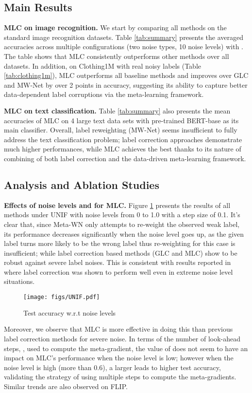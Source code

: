 \subsection{Main Results}


\textbf{MLC on image recognition.} We start by comparing all methods
on the standard image recognition datasets. Table \ref{tab:summary}
presents the averaged accuracies across multiple configurations (two
noise types, 10 noise levels) with . The table shows that MLC
consistently outperforms other methods over all datasets.  In
addition, on Clothing1M with real noisy labels (Table
\ref{tab:clothing1m}), MLC outperforms all baseline methods and
improves over GLC and MW-Net by over 2 points in accuracy, suggesting
its ability to capture better data-dependent label corruptions via the
meta-learning framework.

\textbf{MLC on text classification.} Table \ref{tab:summary} also
presents the mean accuracies of MLC on 4 large text data sets with
pre-trained BERT-base as its main classifier. Overall, label reweighting (MW-Net) seems insufficient to fully address the text classification problem; label correction approaches demonstrate much higher performances, while MLC achieves the best thanks to its nature of combining of both label
correction and the data-driven meta-learning framework.

\subsection{Analysis and Ablation Studies}

\textbf{Effects of noise levels  and  for MLC.} Figure \ref{ref:noise_level_unif} presents the results of all
methods under \textsf{UNIF} with noise levels from 0 to 1.0 with a
step size of 0.1. It's clear that, since Meta-WN only attempts to
re-weight the observed weak label, its performance decreases
significantly when the noise level goes up, as the given label turns
more likely to be the wrong label thus re-weighting for this case is
insufficient; while label correction based methods (GLC and MLC) show
to be robust against severe label noises. This is consistent with results reported in ~\cite{hendrycks2018using} where label correction was shown to perform well even in extreme noise level situations. 
  \begin{figure}[t]\centering
   \texttt{[image: figs/UNIF.pdf]}
  \caption{Test accuracy w.r.t noise levels}
  \label{ref:noise_level_unif}
\end{figure}
Moreover, we observe that MLC is more effective in doing this than previous label correction methods for severe 
noise. In terms of the number of look-ahead steps, , used to compute the meta-gradient, the value of  does not seem to have an impact on MLC's performance when the noise level is low; however when the noise level is high (more than 0.6), a larger  leads to higher test accuracy, validating the strategy of using multiple steps to compute the meta-gradients. Similar trends are also observed on \textsf{FLIP}.

